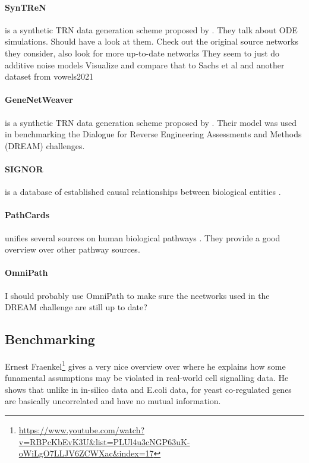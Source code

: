 \documentclass{article}
\begin{document}
\paragraph{SynTReN}
is a synthetic TRN data generation scheme proposed by \cite{van2006syntren}. 
They talk about ODE simulations. Should have a look at them.
Check out the original source networks they consider, also look for more up-to-date networks
They seem to just do additive noise models
Visualize and compare that to Sachs et al and another dataset from vowels2021

\paragraph{GeneNetWeaver} is a synthetic TRN data generation scheme proposed by \cite{schaffter2011genenetweaver}. Their model was used in benchmarking the Dialogue for Reverse Engineering Assessments and Methods (DREAM) challenges.

\paragraph{SIGNOR} is a database of established causal relationships between biological entities \cite{perfetto2016signor}.

\paragraph{PathCards} unifies several sources on human biological pathways \cite{belinky2015pathcards}.
They provide a good overview over other pathway sources.

\paragraph{OmniPath} I should probably use OmniPath to make sure the neetworks used in the DREAM challenge are still up to date?

\subsection{Benchmarking}

Ernest Fraenkel\footnote{\url{https://www.youtube.com/watch?v=RBPcKbEvK3U&list=PLUl4u3cNGP63uK-oWiLgO7LLJV6ZCWXac&index=17}} gives a very nice overview over \cite{marbach2012wisdom} where he explains how some funamental assumptions may be violated in real-world cell signalling data.
He shows that unlike in in-silico data and E.coli data, for yeast co-regulated genes are basically uncorrelated and have no mutual information.
\end{document}
